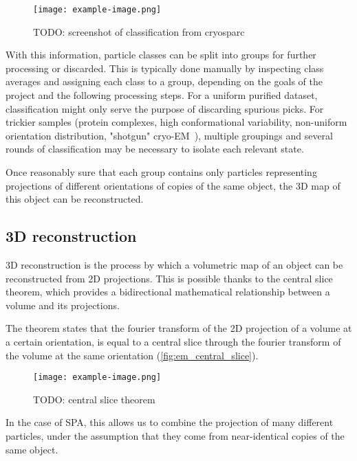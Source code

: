 \begin{figure}[ht]
    \centering
    \texttt{[image: example-image.png]}
    \caption{TODO: screenshot of classification from cryosparc}
    \label{fig:em_classification}
\end{figure}

With this information, particle classes can be split into groups for further processing or discarded.
This is typically done manually by inspecting class averages and assigning each class to a group, depending on the goals of the project and the following processing steps.
For a uniform purified dataset, classification might only serve the purpose of discarding spurious picks.
For trickier samples (protein complexes, high conformational variability, non-uniform orientation distribution, "shotgun" cryo-EM~\cite{suBuildRetrieveMethodology2021,kyrilisIntegrativeBiologyNative2019}), multiple groupings and several rounds of classification may be necessary to isolate each relevant state.

Once reasonably sure that each group contains only particles representing projections of different orientations of copies of the same object, the 3D map of this object can be reconstructed.

\subsection{3D reconstruction}\label{em_reconstruction}

3D reconstruction is the process by which a volumetric map of an object can be reconstructed from 2D projections.
This is possible thanks to the central slice theorem, which provides a bidirectional mathematical relationship between a volume and its projections.

The theorem states that the fourier transform of the 2D projection of a volume at a certain orientation, is equal to a central slice through the fourier transform of the volume at the same orientation (\autoref{fig:em_central_slice}).

\begin{figure}[ht]
    \centering
    \texttt{[image: example-image.png]}
    \caption{TODO: central slice theorem}
    \label{fig:em_central_slice}
\end{figure}

In the case of SPA, this allows us to combine the projection of many different particles, under the assumption that they come from near-identical copies of the same object.

